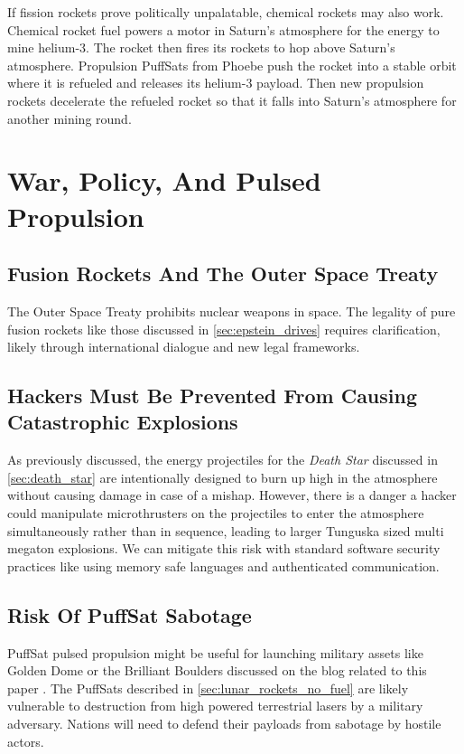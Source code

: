 \documentclass{article}
\begin{document}
If fission rockets prove politically unpalatable, chemical rockets may also work.   Chemical rocket fuel powers a motor in Saturn's atmosphere for the energy to mine helium-3.  The rocket then fires its rockets to hop above Saturn's atmosphere.   Propulsion PuffSats from Phoebe push the rocket into a stable orbit where it is refueled and releases its helium-3 payload.  Then new propulsion rockets decelerate the refueled rocket so that it falls into Saturn's atmosphere for another mining round.


\section{War, Policy, And Pulsed Propulsion}
\subsection{Fusion Rockets And The Outer Space Treaty}
The Outer Space Treaty \cite{outer_space_treaty} prohibits nuclear weapons in space. The legality of pure fusion rockets like those discussed in \autoref{sec:epstein_drives} requires clarification, likely through international dialogue and new legal frameworks.

\subsection{Hackers Must Be Prevented From Causing Catastrophic Explosions}
As previously discussed, the energy projectiles for the \textit{Death Star} discussed in \autoref{sec:death_star} are intentionally designed to burn up high in the atmosphere without causing damage in case of a mishap.  However, there is a danger a hacker could manipulate microthrusters on the projectiles to enter the atmosphere simultaneously rather than in sequence, leading to larger Tunguska \cite{longo2007tunguska} sized multi megaton explosions.  We can mitigate this risk with standard software security practices like using memory safe languages and authenticated communication.

\subsection{Risk Of PuffSat Sabotage}
PuffSat pulsed propulsion might be useful for launching military assets like Golden Dome \cite{lockheed_martin_golden_dome} or the Brilliant Boulders \cite{brilliant_boulders} discussed on the blog related to this paper \cite{aim2024}.   The PuffSats described in \autoref{sec:lunar_rockets_no_fuel} are likely vulnerable to destruction from high powered terrestrial lasers by a military adversary.  Nations will need to defend their payloads from sabotage by hostile actors.
\end{document}
